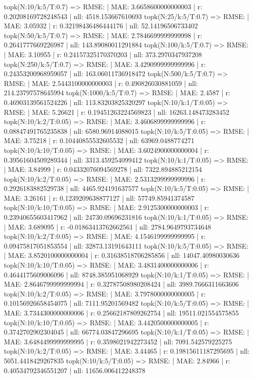 topk(N:10/k:5/T:0.7) => RMSE: | MAE: 3.6658600000000003 | r: 0.20208169728248543 | nll: 4518.153667610693
topk(N:25/k:5/T:0.7) => RMSE: | MAE: 3.05932 | r: 0.32198436486444176 | nll: 52.14196506733402
topk(N:50/k:5/T:0.7) => RMSE: | MAE: 2.7846699999999998 | r: 0.2641777669226987 | nll: 143.89080011291884
topk(N:100/k:5/T:0.7) => RMSE: | MAE: 3.10955 | r: 0.24157325170370203 | nll: 373.2970347937208
topk(N:250/k:5/T:0.7) => RMSE: | MAE: 3.4290999999999996 | r: 0.24353200968959057 | nll: 163.06011736918472
topk(N:500/k:5/T:0.7) => RMSE: | MAE: 2.5443100000000003 | r: 0.490826030881059 | nll: 214.23797578645994
topk(N:1000/k:5/T:0.7) => RMSE: | MAE: 2.4587 | r: 0.46903139561524226 | nll: 113.83203825320297
topk(N:10/k:1/T:0.05) => RMSE: | MAE: 5.26621 | r: 0.19451263224569823 | nll: 16263.148473283452
topk(N:10/k:2/T:0.05) => RMSE: | MAE: 3.4606899999999996 | r: 0.08847491765235838 | nll: 6580.96914088015
topk(N:10/k:5/T:0.05) => RMSE: | MAE: 3.75218 | r: 0.10440855532605532 | nll: 63969.0488774271
topk(N:10/k:10/T:0.05) => RMSE: | MAE: 3.6024900000000004 | r: 0.39561604509289344 | nll: 3313.459254099412
topk(N:10/k:1/T:0.05) => RMSE: | MAE: 3.84999 | r: 0.04332076094569278 | nll: 7322.894885212154
topk(N:10/k:2/T:0.05) => RMSE: | MAE: 2.5313299999999996 | r: 0.2926183882529738 | nll: 4465.924191637577
topk(N:10/k:5/T:0.05) => RMSE: | MAE: 3.26161 | r: 0.1239209638877127 | nll: 57749.85941374587
topk(N:10/k:10/T:0.05) => RMSE: | MAE: 2.9125300000000003 | r: 0.23940655603417962 | nll: 24730.09696231816
topk(N:10/k:1/T:0.05) => RMSE: | MAE: 3.689095 | r: -0.01863413762662561 | nll: 2784.9649793734648
topk(N:10/k:2/T:0.05) => RMSE: | MAE: 4.1546199999999995 | r: 0.09475817051853554 | nll: 32873.13191643111
topk(N:10/k:5/T:0.05) => RMSE: | MAE: 3.8520100000000004 | r: 0.31638518706285856 | nll: 14047.40980030636
topk(N:10/k:10/T:0.05) => RMSE: | MAE: 3.4831400000000006 | r: 0.4644175609006096 | nll: 8748.385951068929
topk(N:10/k:1/T:0.05) => RMSE: | MAE: 2.8646799999999994 | r: 0.32787508980208424 | nll: 3989.7666311663606
topk(N:10/k:2/T:0.05) => RMSE: | MAE: 3.7978000000000005 | r: 0.10156926658454075 | nll: 7111.95201569482
topk(N:10/k:5/T:0.05) => RMSE: | MAE: 3.7344300000000006 | r: 0.25662187809262754 | nll: 19511.021554575855
topk(N:10/k:10/T:0.05) => RMSE: | MAE: 3.4420500000000005 | r: 0.3742702902304045 | nll: 66774.03847296695
topk(N:10/k:1/T:0.05) => RMSE: | MAE: 3.6484499999999995 | r: 0.3598021942273452 | nll: 7091.542579225275
topk(N:10/k:2/T:0.05) => RMSE: | MAE: 3.44465 | r: 0.19815611187295695 | nll: 5051.4418429267835
topk(N:10/k:5/T:0.05) => RMSE: | MAE: 2.84966 | r: 0.40534792346551207 | nll: 11656.006412248378
